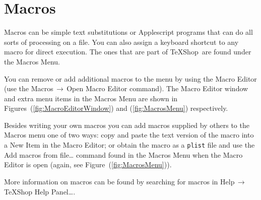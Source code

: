 \documentclass[letterpaper,11pt]{article}
\newcommand{\TS}{\textsf{\TeX Shop}}
\newcommand{\cmd}[1]{\textsf{#1}}
\newcommand{\mnu}[1]{\textsf{#1}}
\newcommand{\To}{\,\(\to\)\,}
\begin{document}
\section{Macros}

Macros can be simple text substitutions or Applescript programs that can do all sorts of processing on a file. You can also assign a keyboard shortcut to any macro for direct execution. The ones that are part of \TS\ are found under the \mnu{Macros} Menu.

You can remove or add additional macros to the menu by using the \mnu{Macro Editor} (use the \mnu{Macros}\To\mnu{Open Macro Editor} command). The \mnu{Macro Editor} window and extra menu items in the \mnu{Macros} Menu are shown in Figures~(\ref{fig:MacroEditorWindow}) and (\ref{fig:MacrosMenu}) respectively.

Besides writing your own macros you can add macros supplied by others to the \mnu{Macros} menu one of two ways: copy and paste the text version of the macro into a \mnu{New Item} in the \mnu{Macro Editor}; or obtain the macro as a \texttt{plist} file and use the \mnu{Add macros from file…} command found in the \mnu{Macros} Menu when the \mnu{Macro Editor} is open (again, see Figure~(\ref{fig:MacrosMenu})).

More information on macros can be found by searching for \cmd{macros} in \mnu{Help}\To\mnu{TeXShop Help Panel…}.

\begin{figure}
\begin{floatrow}
%
\end{floatrow}
\end{figure}
\end{document}
